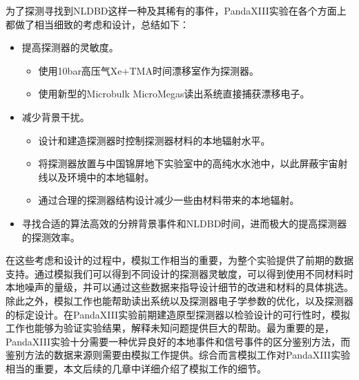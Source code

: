 为了探测寻找到NLDBD这样一种及其稀有的事件，PandaXIII实验在各个方面上都做了相当细致的考虑和设计，总结如下：
\begin{itemize}
    \item 提高探测器的灵敏度。
    \begin{itemize}
        \item 使用10bar高压气Xe+TMA时间漂移室作为探测器。
        \item 使用新型的Microbulk MicroMegas读出系统直接捕获漂移电子。
    \end{itemize}
    \item 减少背景干扰。
    \begin{itemize}
        \item 设计和建造探测器时控制探测器材料的本地辐射水平。
        \item 将探测器放置与中国锦屏地下实验室中的高纯水水池中，以此屏蔽宇宙射线以及环境中的本地辐射。
        \item 通过合理的探测器结构设计减少一些由材料带来的本地辐射。
    \end{itemize}
    \item 寻找合适的算法高效的分辨背景事件和NLDBD时间，进而极大的提高探测器的探测效率。
\end{itemize}
在这些考虑和设计的过程中，模拟工作相当的重要，为整个实验提供了前期的数据支持。通过模拟我们可以得到不同设计的探测器灵敏度，可以得到使用不同材料时本地噪声的量级，并可以通过这些数据来指导设计细节的改进和材料的具体挑选。除此之外，模拟工作也能帮助读出系统以及探测器电子学参数的优化，以及探测器的标定设计。在PandaXIII实验前期建造原型探测器以检验设计的可行性时，模拟工作也能够为验证实验结果，解释未知问题提供巨大的帮助。最为重要的是，PandaXIII实验十分需要一种优异良好的本地事件和信号事件的区分鉴别方法，而鉴别方法的数据来源则需要由模拟工作提供。综合而言模拟工作对PandaXIII实验相当的重要，本文后续的几章中详细介绍了模拟工作的细节。

